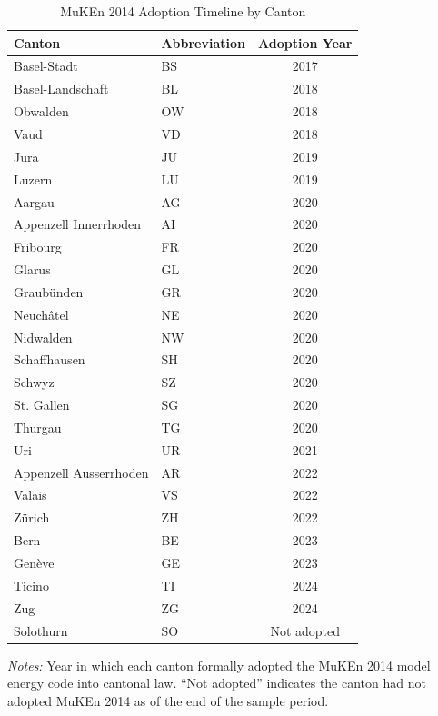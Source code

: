 \begin{table}[!htbp]
\centering
\caption{MuKEn 2014 Adoption Timeline by Canton}
\label{tab:adoption}
\begin{tabular}{llc}
\toprule
Canton & Abbreviation & Adoption Year \\
\midrule
Basel-Stadt & BS & 2017 \\
Basel-Landschaft & BL & 2018 \\
Obwalden & OW & 2018 \\
Vaud & VD & 2018 \\
Jura & JU & 2019 \\
Luzern & LU & 2019 \\
Aargau & AG & 2020 \\
Appenzell Innerrhoden & AI & 2020 \\
Fribourg & FR & 2020 \\
Glarus & GL & 2020 \\
Graubünden & GR & 2020 \\
Neuchâtel & NE & 2020 \\
Nidwalden & NW & 2020 \\
Schaffhausen & SH & 2020 \\
Schwyz & SZ & 2020 \\
St. Gallen & SG & 2020 \\
Thurgau & TG & 2020 \\
Uri & UR & 2021 \\
Appenzell Ausserrhoden & AR & 2022 \\
Valais & VS & 2022 \\
Zürich & ZH & 2022 \\
Bern & BE & 2023 \\
Genève & GE & 2023 \\
Ticino & TI & 2024 \\
Zug & ZG & 2024 \\
Solothurn & SO & Not adopted \\
\bottomrule
\end{tabular}
\begin{minipage}{0.7\textwidth}
\vspace{6pt}
\footnotesize
\textit{Notes:} Year in which each canton formally adopted the MuKEn 2014 model energy code into cantonal law. ``Not adopted'' indicates the canton had not adopted MuKEn 2014 as of the end of the sample period.
\end{minipage}
\end{table}
